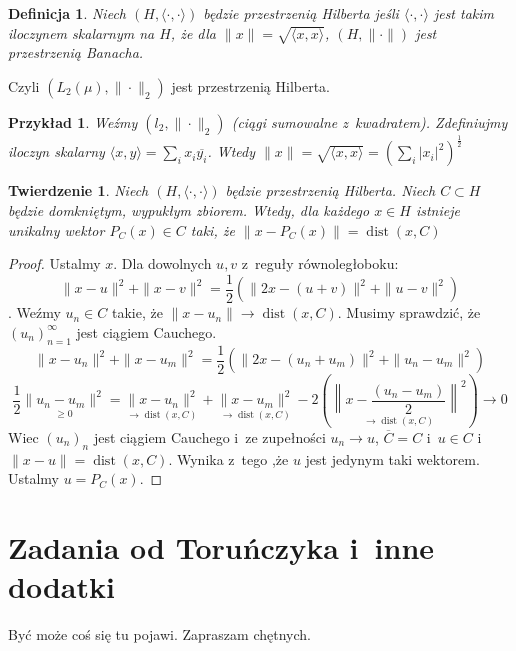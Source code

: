 \documentclass[11pt]{mwrep}
\renewcommand{\[}{\begin{equation}}
\renewcommand{\]}{\end{equation}}
\newcommand{\dist}{\operatorname{dist}}
\newcommand{\norm}{\|\cdot\|}
\newcommand{\scal}{\langle \cdot,\cdot \rangle}
\newtheorem{twr}[subsection]{Twierdzenie}%
\newtheorem{de}[subsection]{Definicja}
\newtheorem{ex}[subsection]{Przykład}
\begin{document}
\begin{de}
	Niech $(H,\langle \cdot,\cdot \rangle)$ będzie przestrzenią Hilberta jeśli $\langle \cdot,\cdot \rangle$ jest takim iloczynem skalarnym na $H$, że dla 
	$\|x\| = \sqrt{\langle x,x \rangle}$, $(H,\norm)$ jest przestrzenią Banacha. 
\end{de}
Czyli $(L_2(\mu),\|\cdot\|_2)$ jest przestrzenią Hilberta.
\begin{ex}
	Weźmy $(l_2,\norm_2)$ (ciągi sumowalne z~kwadratem). Zdefiniujmy iloczyn skalarny $\langle x,y \rangle = \sum_{i}^{}x_i \overline{y_i}$.
	Wtedy $\|x\| = \sqrt{\langle x,x \rangle} = \left( \sum_{i}^{}|x_i|^2 \right)^\frac{1}{2}$
\end{ex}
\begin{twr}
	Niech $(H,\scal)$ będzie przestrzenią Hilberta. Niech $C\subset H$ będzie domkniętym, wypukłym zbiorem.
	Wtedy, dla każdego $x\in H$ istnieje unikalny wektor $P_C(x) \in C$ taki, że $\|x-P_C(x) \| = \dist(x,C)$
\end{twr}
\begin{proof}
	Ustalmy $x$. Dla dowolnych $u,v$ z~reguły równoległoboku: 
	$$\|x - u\|^2 + \|x - v\|^2 = \frac{1}{2}\left( \|2x - (u+v)\|^2 + \|u-v\|^2 \right)$$.
	Weźmy $u_n\in C$ takie, że $\|x-u_n\| \to \dist(x,C)$.
	Musimy sprawdzić, że $(u_n)_{n=1}^\infty$ jest ciągiem Cauchego.
	$$\|x-u_n\|^2 + \|x-u_m\|^2 = \frac{1}{2}\left( \|2x -(u_n+u_m)\|^2 + \|u_n - u_m\|^2 \right)$$
	$$\frac{1}{2} \underset{\ge 0}{\|u_n-u_m\|^2} = \underset{\to \dist(x,C)}{\|x-u_n\|^2} + \underset{\to \dist(x,C)}{\|x-u_m\|^2} - 
	2 \left( \underset{\to \dist(x,C)}{\left\|x-\frac{(u_n-u_m)}{2}\right\|^2} \right) \longrightarrow 0$$
	Wiec $(u_n)_n$ jest ciągiem Cauchego i~ze zupełności $u_n \to u$, $\overline{C} = C$ i~$u\in C$ 
	i~$\|x -u\|= \dist(x,C)$. Wynika z~tego ,że $u$ jest jedynym taki wektorem. Ustalmy $u = P_C(x)$.
\end{proof}
\chapter{Zadania od Toruńczyka i~inne dodatki}
Być może coś się tu pojawi. Zapraszam chętnych. 
\newpage
\end{document}
